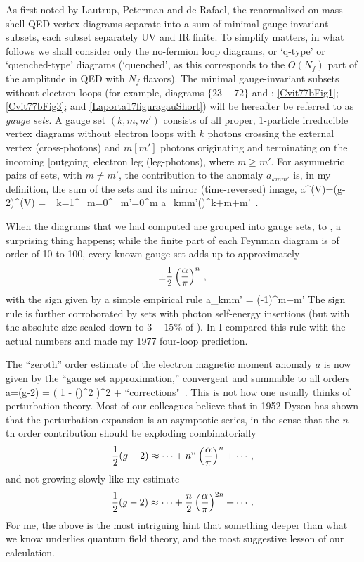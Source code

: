 As first noted by Lautrup, Peterman and de Rafael, the
renormalized on-mass shell QED vertex diagrams separate into a sum of
minimal gauge-invariant subsets, each subset separately UV and IR finite.
To simplify matters, in what follows we shall consider only the
no-fermion loop diagrams, or `q-type' or `quenched-type' diagrams
(`quenched', as this corresponds to the $O(N_f)$ part of the amplitude in
QED with $N_f$ flavors).
The minimal
gauge-invariant subsets without electron loops (for example,
 diagrams $\{23-72\}$ and ;
\ref{Cvit77bFig1}; \ref{Cvit77bFig3}; and \ref{Laporta17figuragauShort})
will be hereafter be referred to as \emph{gauge sets}. A gauge set
$(k,m,m')$ consists of all proper, 1-particle irreducible vertex diagrams
without electron loops with $k$ photons crossing the external vertex
(cross-photons) and $m [m']$ photons originating and terminating on the
incoming [outgoing] electron leg (leg-photons), where $m\geq m'$. For
asymmetric pairs of sets, with $m\neq m'$, the contribution to the
anomaly $a_{kmm'}$ is, in my definition, the sum of the sets and its
mirror (time-reversed) image,
\beq
a^{(V)}=(g-2)^{(V)}
       =  \sum_{k=1}^\infty\sum_{m=0}^\infty\sum_{m'=0}^m
          a_{kmm'}\left(\frac{\alpha}{\pi}\right)^{k+m+m'}
\,.

When the diagrams that we had computed are grouped into
gauge sets,  to ,
a surprising thing happens; while the
finite part of each Feynman diagram is of order of 10 to 100, every
known gauge set adds up to approximately
$$
		   \pm {1 \over 2} \left(\frac{\alpha}{\pi}\right)^n
\,,
$$
with the sign given by a simple empirical rule
\beq
a_{kmm'} = (-1)^{m+m'}
The sign rule is further corroborated by sets with photon
self-energy insertions (but with the absolute size scaled down to
$3-15\%$ of ).
In  I compared this rule with the actual numbers and
made my 1977 four-loop prediction.

The ``zeroth'' order
estimate of the electron magnetic moment anomaly $a$ is now given by
the ``gauge set approximation,'' convergent and summable to all orders
\beq
a=(g-2) =   \frac{\alpha}{\pi}
           {\left( 1 - \left(\frac{\alpha}{\pi}\right)^2
			\right)^2
		      } + \mbox{``corrections"}
\,.
This is not how one usually thinks of perturbation theory.
Most of our colleagues believe that in 1952
Dyson has shown that the perturbation expansion is an
asymptotic series, in the sense that the $n$-th order contribution should
be exploding combinatorially
$$
{1 \over 2} (g-2) \approx
\cdots + n^n \left(\frac{\alpha}{\pi}\right)^n + \cdots
\,,
$$
and not growing slowly like my estimate
\[
{1 \over 2} (g-2) \approx
\cdots + \frac{n}{2}\left(\frac{\alpha}{\pi}\right)^{2n} + \cdots
\,.
\]
For me, the above is the most intriguing hint that something deeper than
what we know underlies quantum field theory, and the most suggestive
lesson of our calculation.




